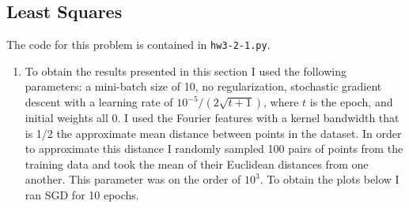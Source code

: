 \documentclass{article}
\begin{document}
\subsection{Least Squares}
The code for this problem is contained in \texttt{hw3-2-1.py}.
\begin{enumerate}
	\item To obtain the results presented in this section I used the following parameters: a mini-batch size of 10, no regularization, stochastic gradient descent with a learning rate of $10^{-5} / (2\sqrt{t+1})$, where $t$ is the epoch, and initial weights all 0. I used the Fourier features with a kernel bandwidth that is 1/2 the approximate mean distance between points in the dataset. In order to approximate this distance I randomly sampled 100 pairs of points from the training data and took the mean of their Euclidean distances from one another. This parameter was on the order of $10^3$. To obtain the plots below I ran SGD for 10 epochs.



\end{enumerate}
\end{document}
